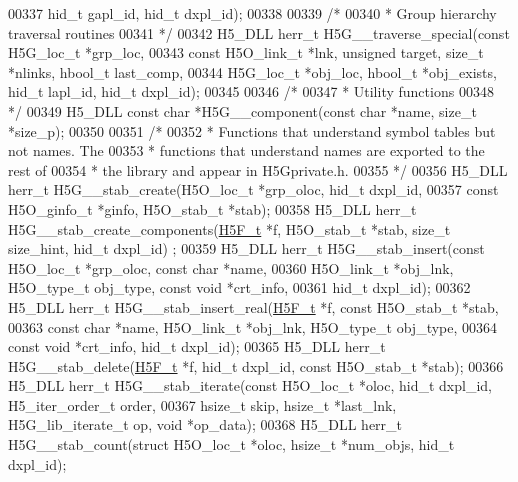 \begin{DoxyCode}
00337     hid\_t gapl\_id, hid\_t dxpl\_id);
00338 
00339 \textcolor{comment}{/*}
00340 \textcolor{comment}{ * Group hierarchy traversal routines}
00341 \textcolor{comment}{ */}
00342 H5\_DLL herr\_t H5G\_\_traverse\_special(\textcolor{keyword}{const} H5G\_loc\_t *grp\_loc,
00343     \textcolor{keyword}{const} H5O\_link\_t *lnk, \textcolor{keywordtype}{unsigned} target, \textcolor{keywordtype}{size\_t} *nlinks, hbool\_t last\_comp,
00344     H5G\_loc\_t *obj\_loc, hbool\_t *obj\_exists, hid\_t lapl\_id, hid\_t dxpl\_id);
00345 
00346 \textcolor{comment}{/*}
00347 \textcolor{comment}{ * Utility functions}
00348 \textcolor{comment}{ */}
00349 H5\_DLL \textcolor{keyword}{const} \textcolor{keywordtype}{char} *H5G\_\_component(\textcolor{keyword}{const} \textcolor{keywordtype}{char} *name, \textcolor{keywordtype}{size\_t} *size\_p);
00350 
00351 \textcolor{comment}{/*}
00352 \textcolor{comment}{ * Functions that understand symbol tables but not names.  The}
00353 \textcolor{comment}{ * functions that understand names are exported to the rest of}
00354 \textcolor{comment}{ * the library and appear in H5Gprivate.h.}
00355 \textcolor{comment}{ */}
00356 H5\_DLL herr\_t H5G\_\_stab\_create(H5O\_loc\_t *grp\_oloc, hid\_t dxpl\_id,
00357     \textcolor{keyword}{const} H5O\_ginfo\_t *ginfo, H5O\_stab\_t *stab);
00358 H5\_DLL herr\_t H5G\_\_stab\_create\_components(\hyperlink{struct_h5_f__t}{H5F\_t} *f, H5O\_stab\_t *stab, \textcolor{keywordtype}{size\_t} size\_hint, hid\_t dxpl\_id)
      ;
00359 H5\_DLL herr\_t H5G\_\_stab\_insert(\textcolor{keyword}{const} H5O\_loc\_t *grp\_oloc, \textcolor{keyword}{const} \textcolor{keywordtype}{char} *name,
00360     H5O\_link\_t *obj\_lnk, H5O\_type\_t obj\_type, \textcolor{keyword}{const} \textcolor{keywordtype}{void} *crt\_info,
00361     hid\_t dxpl\_id);
00362 H5\_DLL herr\_t H5G\_\_stab\_insert\_real(\hyperlink{struct_h5_f__t}{H5F\_t} *f, \textcolor{keyword}{const} H5O\_stab\_t *stab,
00363     \textcolor{keyword}{const} \textcolor{keywordtype}{char} *name, H5O\_link\_t *obj\_lnk, H5O\_type\_t obj\_type,
00364     \textcolor{keyword}{const} \textcolor{keywordtype}{void} *crt\_info, hid\_t dxpl\_id);
00365 H5\_DLL herr\_t H5G\_\_stab\_delete(\hyperlink{struct_h5_f__t}{H5F\_t} *f, hid\_t dxpl\_id, \textcolor{keyword}{const} H5O\_stab\_t *stab);
00366 H5\_DLL herr\_t H5G\_\_stab\_iterate(\textcolor{keyword}{const} H5O\_loc\_t *oloc, hid\_t dxpl\_id, H5\_iter\_order\_t order,
00367     hsize\_t skip, hsize\_t *last\_lnk, H5G\_lib\_iterate\_t op, \textcolor{keywordtype}{void} *op\_data);
00368 H5\_DLL herr\_t H5G\_\_stab\_count(\textcolor{keyword}{struct} H5O\_loc\_t *oloc, hsize\_t *num\_objs, hid\_t dxpl\_id);

\end{DoxyCode}
